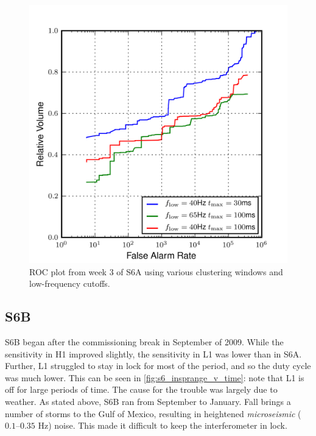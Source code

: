\begin{figure}[p]
\label{fig:roc_cluster_windows}
\center
\includegraphics[width=5in]{figures/s6_clusterwin_investigation/s6week3cat4_ROC.png}
\caption{ROC plot from week 3 of S6A using various clustering windows and low-frequency cutoffs.}
\end{figure}


\subsection{S6B}
\label{sec:s6b}

S6B began after the commissioning break in September of 2009. While the sensitivity in H1 improved slightly, the sensitivity in L1 was lower than in S6A. Further, L1 struggled to stay in lock for most of the period, and so the duty cycle was much lower. This can be seen in \ref{fig:s6_insprange_v_time}: note that L1 is off for large periods of time. The cause for the trouble was largely due to weather. As stated above, S6B ran from September to January. Fall brings a number of storms to the Gulf of Mexico, resulting in heightened \emph{microseismic} ($0.1$--$0.35$ Hz) noise. This made it difficult to keep the interferometer in lock.

